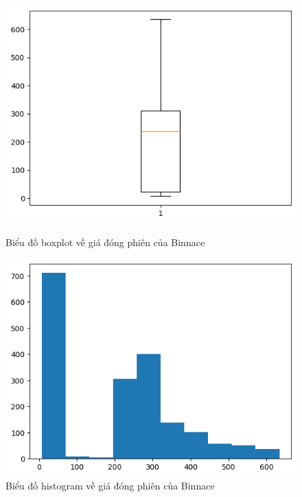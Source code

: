 \documentclass{ieeeojies}
\begin{document}
\begin{figure}[H]
    \centering
    \begin{minipage}{0.23\textwidth}
    \centering
    \includegraphics[width=1\textwidth]{bibliography/pictures/BNBboxplot.png}
    \caption{Biểu đồ boxplot về giá đóng phiên của Binnace}
    \label{fig:1}
    \end{minipage}
    \hfill
    \begin{minipage}{0.23\textwidth}
    \centering
    \includegraphics[width=1\textwidth]{bibliography/pictures/BNBhistogram.png}
    \caption{Biểu đồ histogram về giá đóng phiên của Binnace}
    \label{fig:2}
    \end{minipage}
\end{figure}
\end{document}
